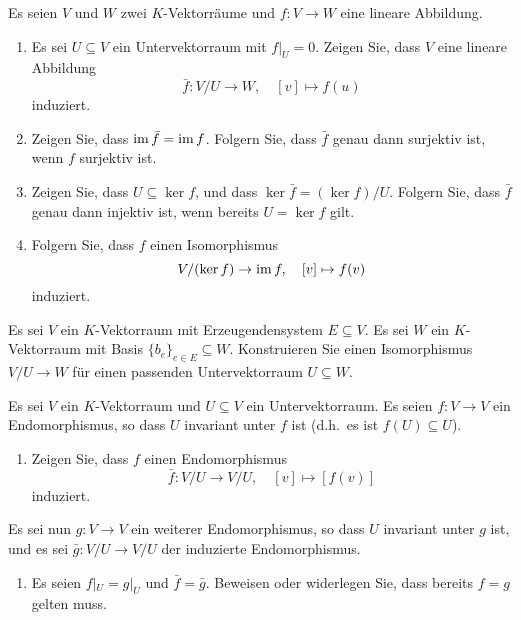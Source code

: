 \documentclass[a4paper,10pt]{scrartcl}
\begin{document}

\begin{question}
  Es seien $V$ und $W$ zwei $K$-Vektorräume und $f \colon V \to W$ eine lineare Abbildung.
  \begin{enumerate}
    \item
      Es sei $U \subseteq V$ ein Untervektorraum mit $f|_U = 0$.
      Zeigen Sie, dass $V$ eine lineare Abbildung
      \[
        \bar{f} \colon V/U \to W, \quad [v] \mapsto f(u)
      \]
      induziert.
    \item
      Zeigen Sie, dass $\operatorname{im} \bar{f} = \operatorname{im} f$.
      Folgern Sie, dass $\bar{f}$ genau dann surjektiv ist, wenn $f$ surjektiv ist.
    \item
      Zeigen Sie, dass $U \subseteq \ker f$, und dass $\ker \bar{f} = (\ker f)/U$.
      Folgern Sie, dass $\bar{f}$ genau dann injektiv ist, wenn bereits $U = \ker f$ gilt.
    \item
      Folgern Sie, dass $f$ einen Isomorphismus
      \[
        V/(\ker f) \to \operatorname{im} f,
        \quad
        [v] \mapsto f(v)
      \]
      induziert.
  \end{enumerate}
\end{question}


\begin{question}
  Es sei $V$ ein $K$-Vektorraum mit Erzeugendensystem $E \subseteq V$.
  Es sei $W$ ein $K$-Vektorraum mit Basis $\{b_e\}_{e \in E} \subseteq W$.
  Konstruieren Sie einen Isomorphismus $V/U \to W$ für einen passenden Untervektorraum $U \subseteq W$.
\end{question}


\begin{question}
  Es sei $V$ ein $K$-Vektorraum und $U \subseteq V$ ein Untervektorraum.
  Es seien $f \colon V \to V$ ein Endomorphismus, so dass $U$ invariant unter $f$ ist (d.h.\ es ist $f(U) \subseteq U$).
  \begin{enumerate}
    \item
      Zeigen Sie, dass $f$ einen Endomorphismus
      \[
        \bar{f} \colon V/U \to V/U,
        \quad
        [v] \mapsto [f(v)]
      \]
    induziert.
  \end{enumerate}
  Es sei nun $g \colon V \to V$ ein weiterer Endomorphismus, so dass $U$ invariant unter $g$ ist, und es sei $\bar{g} \colon V/U \to V/U$ der induzierte Endomorphismus.
  \begin{enumerate}[resume]
    \item
      Es seien $f|_U = g|_U$ und $\bar{f} = \bar{g}$.
      Beweisen oder widerlegen Sie, dass bereits $f = g$ gelten muss.
  \end{enumerate}
\end{question}
\end{document}
